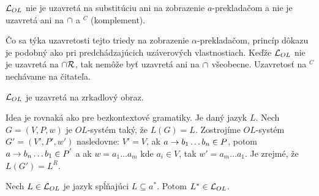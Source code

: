 \begin{dosledok}
  $\mathcal{L}_{OL}$ nie je uzavretá na substitúciu ani na
  zobrazenie $a$-prekladačom a nie je uzavretá ani na $\cap$ a
  $^{C}$ (komplement).
\end{dosledok}

\begin{dokaz}
  Čo sa týka uzavretosti tejto triedy na zobrazenie $\alpha$-prekladačom,
  princíp dôkazu je podobný ako pri predchádzajúcich uzáverových
  vlastnostiach. Keďže $\mathcal{L}_{OL}$ nie je uzavretá na
  $\cap \mathcal{R}$, tak nemôže byť uzavretá ani na $\cap$
  všeobecne. Uzavretosť na $^{C}$ nechávame na čitateľa.
\end{dokaz}


\begin{veta}
  $\mathcal{L}_{OL}$ je uzavretá na zrkadlový obraz.
\end{veta}

\begin{dokaz}
  Idea je rovnaká ako pre bezkontextové gramatiky. Je daný jazyk
  $L$. Nech $G=(V,P,w)$ je $OL$-systém taký, že $L(G)=L$. Zostrojíme
  $OL$-systém $G'=(V',P',w')$ nasledovne: $V'=V$, ak 
  $a\rightarrow b_{1}\dots b_{n}\in P$,
  potom $a\rightarrow b_{n}\dots b_{1}\in P^{'}$ a ak
  $w=a_{1}\dots a_{m}$ kde $a_i\in V$, tak $w'=a_{m}\dots
  a_{1}$. Je zrejmé, že $L(G')=L^{R}$.
\end{dokaz}


\begin{veta}
  Nech $L \in \mathcal{L}_{OL}$ je jazyk spĺňajúci $L\subseteq a^{*}$.
  Potom $L^{*} \in \mathcal{L}_{OL}$.
\end{veta}

